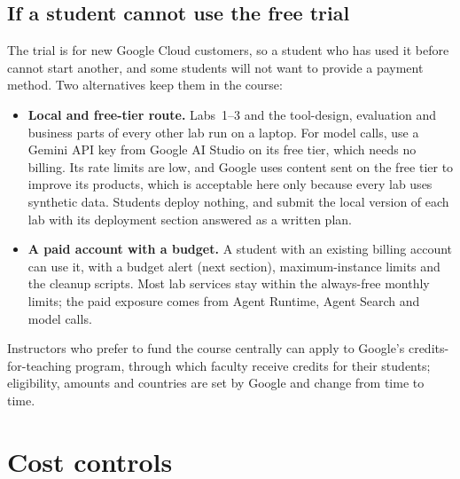 \subsection{If a student cannot use the free trial}

The trial is for new Google Cloud customers, so a student who has used it before cannot start another, and some students will not want to provide a payment method. Two alternatives keep them in the course:
\begin{itemize}[itemsep=2pt]
  \item \textbf{Local and free-tier route.} Labs~1--3 and the tool-design, evaluation and business parts of every other lab run on a laptop. For model calls, use a Gemini API key from Google AI Studio on its free tier, which needs no billing. Its rate limits are low, and Google uses content sent on the free tier to improve its products, which is acceptable here only because every lab uses synthetic data. Students deploy nothing, and submit the local version of each lab with its deployment section answered as a written plan.
  \item \textbf{A paid account with a budget.} A student with an existing billing account can use it, with a budget alert (next section), maximum-instance limits and the cleanup scripts. Most lab services stay within the always-free monthly limits; the paid exposure comes from Agent Runtime, Agent Search and model calls.
\end{itemize}
Instructors who prefer to fund the course centrally can apply to Google's credits-for-teaching program, through which faculty receive credits for their students; eligibility, amounts and countries are set by Google and change from time to time.

\section{Cost controls}

